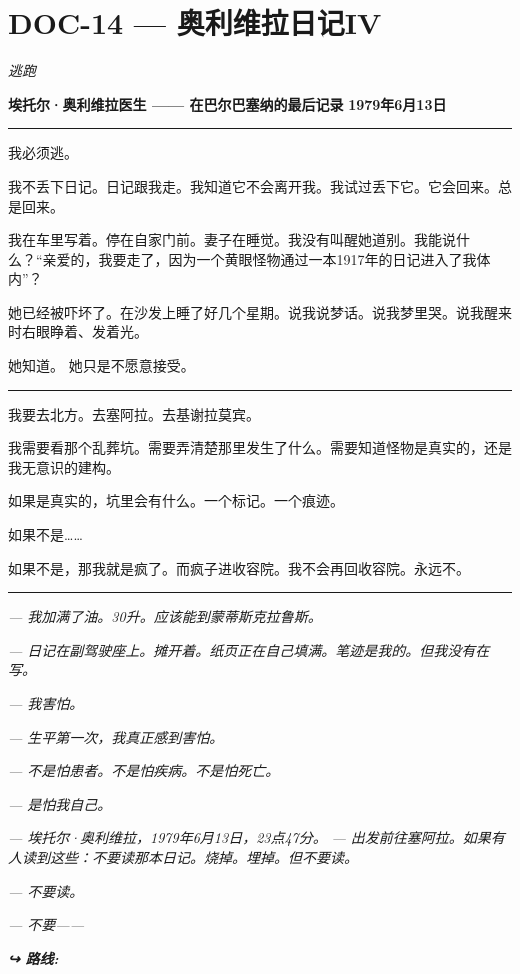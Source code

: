 \section*{\textbf{DOC-14} --- 奥利维拉日记IV}

\noindent \textit{逃跑}

\noindent \textbf{埃托尔·奥利维拉医生 —— 在巴尔巴塞纳的最后记录}
\textbf{1979年6月13日}

\vspace{0.5em}\noindent\rule{\textwidth}{0.5pt}\vspace{0.5em}

\noindent 我必须逃。

\noindent 我不丢下日记。日记跟我走。我知道它不会离开我。我试过丢下它。它会回来。总是回来。

\noindent 我在车里写着。停在自家门前。妻子在睡觉。我没有叫醒她道别。我能说什么？“亲爱的，我要走了，因为一个黄眼怪物通过一本1917年的日记进入了我体内”？

\noindent 她已经被吓坏了。在沙发上睡了好几个星期。说我说梦话。说我梦里哭。说我醒来时右眼睁着、发着光。

\noindent 她知道。
她只是不愿意接受。

\vspace{0.5em}\noindent\rule{\textwidth}{0.5pt}\vspace{0.5em}

\noindent 我要去北方。去塞阿拉。去基谢拉莫宾。

\noindent 我需要看那个乱葬坑。需要弄清楚那里发生了什么。需要知道怪物是真实的，还是我无意识的建构。

\noindent 如果是真实的，坑里会有什么。一个标记。一个痕迹。

\noindent 如果不是……

\noindent 如果不是，那我就是疯了。而疯子进收容院。我不会再回收容院。永远不。

\vspace{0.5em}\noindent\rule{\textwidth}{0.5pt}\vspace{0.5em}

\noindent \textit{--- 我加满了油。30升。应该能到蒙蒂斯克拉鲁斯。}

\noindent \textit{--- 日记在副驾驶座上。摊开着。纸页正在自己填满。笔迹是我的。但我没有在写。}

\noindent \textit{--- 我害怕。}

\noindent \textit{--- 生平第一次，我真正感到害怕。}

\noindent \textit{--- 不是怕患者。不是怕疾病。不是怕死亡。}

\noindent \textit{--- 是怕我自己。}

\noindent \textit{--- 埃托尔·奥利维拉，1979年6月13日，23点47分。}
\textit{--- 出发前往塞阿拉。如果有人读到这些：不要读那本日记。烧掉。埋掉。但不要读。}

\noindent \textit{--- 不要读。}

\noindent \textit{--- 不要——}

\vspace{0.5em}
\noindent\textit{\textbf{↪ 路线:}  \rotasep {} \rotasep {}}
